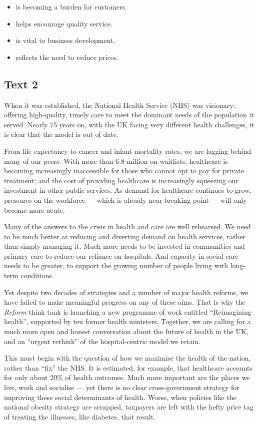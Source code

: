 \documentclass[UTF8,11pt]{ctexart}
\begin{document}
\begin{itemize}[leftmargin=2em,itemsep=.2em,topsep=.4em]\item[A.] is becoming a burden for customers.
\item[B.] helps encourage quality service.
\item[C.] is vital to business development.
\item[D.] reflects the need to reduce prices.
\end{itemize}

\subsection*{\textbf{Text 2}}


When it was established, the National Health Service (NHS) was visionary: offering high-quality, timely care to meet the dominant needs of the population it served. Nearly 75 years on, with the UK facing very different health challenges, it is clear that the model is out of date.


From life expectancy to cancer and infant mortality rates, we are lagging behind many of our peers. With more than 6.8 million on waitlists, healthcare is becoming increasingly inaccessible for those who cannot opt to pay for private treatment; and the cost of providing healthcare is increasingly squeezing our investment in other public services. As demand for healthcare continues to grow, pressures on the workforce — which is already near breaking point — will only become more acute.


Many of the answers to the crisis in health and care are well rehearsed. We need to be much better at reducing and diverting demand on health services, rather than simply managing it. Much more needs to be invested in communities and primary care to reduce our reliance on hospitals. And capacity in social care needs to be greater, to support the growing number of people living with long-term conditions.


Yet despite two decades of strategies and a number of major health reforms, we have failed to make meaningful progress on any of these aims. That is why the \textit{Reform} think tank is launching a new programme of work entitled “Reimagining health”, supported by ten former health ministers. Together, we are calling for a much more open and honest conversation about the future of health in the UK, and an “urgent rethink” of the hospital-centric model we retain.


This must begin with the question of how we maximise the health of the nation, rather than “fix” the NHS. It is estimated, for example, that healthcare accounts for only about 20\% of health outcomes. Much more important are the places we live, work and socialise — yet there is no clear cross-government strategy for improving these social determinants of health. Worse, when policies like the national obesity strategy are scrapped, taxpayers are left with the hefty price tag of treating the illnesses, like diabetes, that result.
\end{document}
